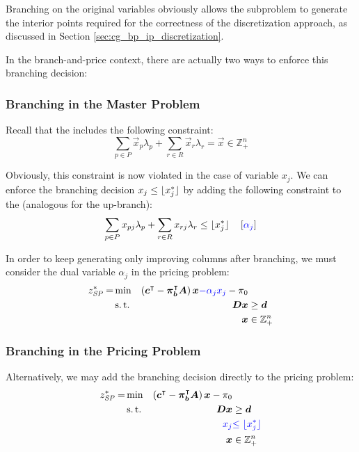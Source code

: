 \begin{note}
Branching on the original variables obviously allows the subproblem to generate the interior points required for the correctness of the discretization approach, as discussed in Section \ref{sec:cg_bp_ip_discretization}.
\end{note}

In the branch-and-price context, there are actually two ways to enforce this branching decision:

\subsubsection{Branching in the Master Problem}
Recall that the \MP{} includes the following constraint:
\begin{equation}
\sum_{p \in P} \vec{x}_p \lambda_p + \sum_{r \in R} \vec{x}_r \lambda_r = \vec{x} \in \mathbb{Z}_+^n
\end{equation}

Obviously, this constraint is now violated in the case of variable $x_j$. We can enforce the branching decision $x_j \leq \lfloor x_j^*\rfloor$ by adding the following constraint to the \MP{} (analogous for the up-branch):
\begin{equation}
\sum_{p \in P} x_{pj} \lambda_p + \sum_{r \in R} x_{rj} \lambda_r \leq \lfloor x_j^*\rfloor \quad \left[{\color{blue} \alpha_j }\right]
\end{equation}

In order to keep generating only improving columns after branching, we must consider the dual variable $\alpha_j$ in the pricing problem:
\begin{equation}
\begin{aligned}
z^*_\SP{} = &\min & \left( \vec{c}\transpose - \vec{\pi}_\vec{b}\transpose \mat{A} \right) \vec{x} {\color{blue} - \alpha_j x_j} - \pi_0 & \\
&\st & \mat{D} \vec{x} & \geq \vec{d} \\
&& \vec{x} & \in \mathbb{Z}_+^n
\end{aligned}
\end{equation}

\subsubsection{Branching in the Pricing Problem}
Alternatively, we may add the branching decision directly to the pricing problem:
\begin{equation}
\begin{aligned}
z^*_\SP{} = &\min & \left( \vec{c}\transpose - \vec{\pi}_\vec{b}\transpose \mat{A} \right) \vec{x} - \pi_0 & \\
&\st & \mat{D} \vec{x} & \geq \vec{d} \\
&& {\color{blue} x_j} & {\color{blue} \leq \floor{x_j^*}}\\
&& \vec{x} & \in \mathbb{Z}_+^n
\end{aligned}
\end{equation}

